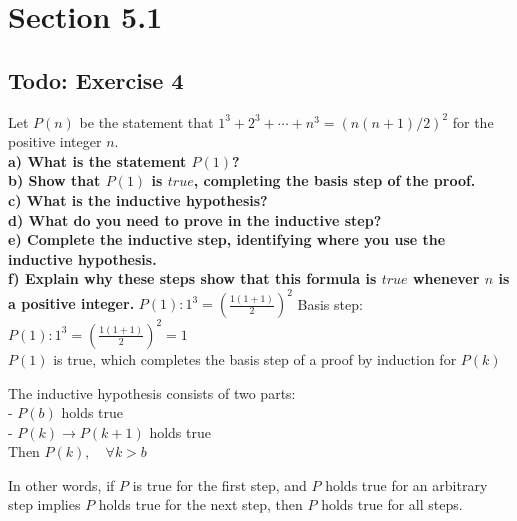 \documentclass[12pt]{article}
\begin{document}
    \section{Section 5.1} 

    \subsection{Todo: Exercise 4}
    Let $P(n)$ be the statement that $1^3 + 2^3 + \cdots + n^3 = (n(n + 1)/2)^2$ for the positive integer $n$.\\
    \textbf{a) What is the statement $P(1)$?}\\
    \textbf{b) Show that $P(1)$ is $true$, completing the basis step of the proof.}\\
    \textbf{c) What is the inductive hypothesis?}\\
    \textbf{d) What do you need to prove in the inductive step?}\\
   \textbf{ e) Complete the inductive step, identifying where you use the inductive hypothesis.}\\
    \textbf{f) Explain why these steps show that this formula is $true$ whenever $n$ is a positive integer.}
        $P(1): 1^3 = (\frac{1(1+1)}{2})^2$
        Basis step:
            $P(1): 1^3 = (\frac{1(1+1)}{2})^2 = 1$ \\
            $P(1)$ is true, which completes the basis step of a proof by
                induction for $P(k)$
    
        The inductive hypothesis consists of two parts: \\
            - $P(b)$ holds true \\
            - $P(k) \rightarrow P(k+1)$ holds true\\
            Then $P(k), \quad \forall k > b$
    
            In other words, if $P$ is true for the first step, and $P$ holds true for an arbitrary step implies $P$ holds true for the next step, then $P$ holds true for all steps. \\
    
\end{document}

